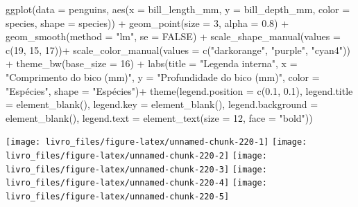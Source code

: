 \documentclass[
]{book}
\newenvironment{Shaded}{\begin{snugshade}}{\end{snugshade}}
\newcommand{\AttributeTok}[1]{\textcolor[rgb]{0.61,0.61,0.61}{#1}}
\newcommand{\ConstantTok}[1]{\textcolor[rgb]{0,0,0}{#1}}
\newcommand{\DecValTok}[1]{\textcolor[rgb]{0.06,0.06,0.06}{#1}}
\newcommand{\FloatTok}[1]{\textcolor[rgb]{0.06,0.06,0.06}{#1}}
\newcommand{\FunctionTok}[1]{\textcolor[rgb]{0,0,0}{#1}}
\newcommand{\NormalTok}[1]{#1}
\newcommand{\SpecialCharTok}[1]{\textcolor[rgb]{0,0,0}{#1}}
\newcommand{\StringTok}[1]{\textcolor[rgb]{0.5,0.5,0.5}{#1}}
\begin{document}
\begin{Shaded}
\begin{Highlighting}[]
\FunctionTok{ggplot}\NormalTok{(}\AttributeTok{data =}\NormalTok{ penguins, }
       \FunctionTok{aes}\NormalTok{(}\AttributeTok{x =}\NormalTok{ bill\_length\_mm, }
           \AttributeTok{y =}\NormalTok{ bill\_depth\_mm,}
           \AttributeTok{color =}\NormalTok{ species,}
           \AttributeTok{shape =}\NormalTok{ species)) }\SpecialCharTok{+}
  \FunctionTok{geom\_point}\NormalTok{(}\AttributeTok{size =} \DecValTok{3}\NormalTok{, }
             \AttributeTok{alpha =} \FloatTok{0.8}\NormalTok{) }\SpecialCharTok{+}
  \FunctionTok{geom\_smooth}\NormalTok{(}\AttributeTok{method =} \StringTok{"lm"}\NormalTok{, }\AttributeTok{se =} \ConstantTok{FALSE}\NormalTok{) }\SpecialCharTok{+}
  \FunctionTok{scale\_shape\_manual}\NormalTok{(}\AttributeTok{values =} \FunctionTok{c}\NormalTok{(}\DecValTok{19}\NormalTok{, }\DecValTok{15}\NormalTok{, }\DecValTok{17}\NormalTok{))}\SpecialCharTok{+}
  \FunctionTok{scale\_color\_manual}\NormalTok{(}\AttributeTok{values =} \FunctionTok{c}\NormalTok{(}\StringTok{"darkorange"}\NormalTok{, }\StringTok{"purple"}\NormalTok{, }\StringTok{"cyan4"}\NormalTok{)) }\SpecialCharTok{+}
  \FunctionTok{theme\_bw}\NormalTok{(}\AttributeTok{base\_size =} \DecValTok{16}\NormalTok{) }\SpecialCharTok{+}
  \FunctionTok{labs}\NormalTok{(}\AttributeTok{title =} \StringTok{"Legenda interna"}\NormalTok{, }\AttributeTok{x =} \StringTok{"Comprimento do bico (mm)"}\NormalTok{, }\AttributeTok{y =} \StringTok{"Profundidade do bico (mm)"}\NormalTok{, }
       \AttributeTok{color =} \StringTok{"Espécies"}\NormalTok{, }\AttributeTok{shape =} \StringTok{"Espécies"}\NormalTok{)}\SpecialCharTok{+}
  \FunctionTok{theme}\NormalTok{(}\AttributeTok{legend.position =} \FunctionTok{c}\NormalTok{(}\FloatTok{0.1}\NormalTok{, }\FloatTok{0.1}\NormalTok{),}
        \AttributeTok{legend.title =} \FunctionTok{element\_blank}\NormalTok{(),}
        \AttributeTok{legend.key =}  \FunctionTok{element\_blank}\NormalTok{(),}
        \AttributeTok{legend.background =} \FunctionTok{element\_blank}\NormalTok{(),}
        \AttributeTok{legend.text =} \FunctionTok{element\_text}\NormalTok{(}\AttributeTok{size =} \DecValTok{12}\NormalTok{, }\AttributeTok{face =} \StringTok{"bold"}\NormalTok{))}
\end{Highlighting}
\end{Shaded}

\begin{center}\texttt{[image: livro\_files/figure-latex/unnamed-chunk-220-1]} \texttt{[image: livro\_files/figure-latex/unnamed-chunk-220-2]} \texttt{[image: livro\_files/figure-latex/unnamed-chunk-220-3]} \texttt{[image: livro\_files/figure-latex/unnamed-chunk-220-4]} \texttt{[image: livro\_files/figure-latex/unnamed-chunk-220-5]} \end{center}
\end{document}
